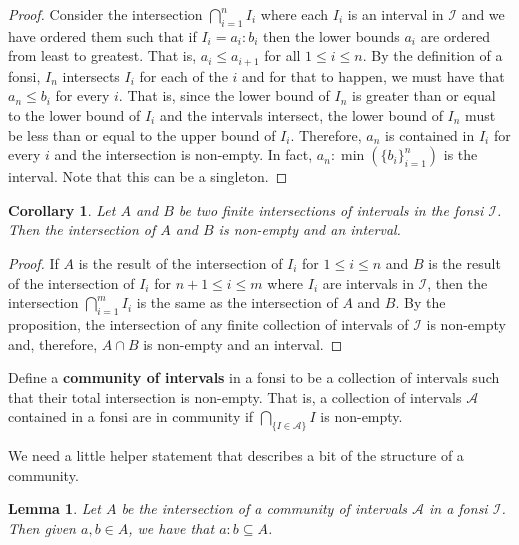 \documentclass[12pt]{article}
\newtheorem{lemma}{Lemma}[subsection]
\newtheorem{corollary}{Corollary}[subsection]
\begin{document}
\begin{proof} 
    Consider the intersection $\bigcap_{i=1}^n I_i$ where each $I_i$ is an interval in $\mathcal{I}$ and we have ordered them such that if $I_i = a_i : b_i$ then the lower bounds $a_i$ are ordered from least to greatest. That is,  $a_i \leq a_{i+1}$ for all $1 \leq i \leq n$. By the definition of a fonsi, $I_n$ intersects $I_i$ for each of the $i$ and for that to happen, we must have that $a_n \leq b_i$ for every $i$. That is, since the lower bound of $I_n$ is greater than or equal to the lower bound of $I_i$ and the intervals intersect, the lower bound of $I_n$ must be less than or equal to the upper bound of $I_i$. Therefore, $a_n$ is contained in $I_i$ for every $i$ and the intersection is non-empty. In fact, $a_n : \min(\{b_i\}_{i=1}^n)$ is the interval. Note that this can be a singleton. 
\end{proof}


\begin{corollary}
Let $A$ and $B$ be two finite intersections of intervals in the fonsi $\mathcal{I}$. Then the intersection of $A$ and $B$ is non-empty and an interval. 
\end{corollary}

\begin{proof}
    If $A$ is the result of the intersection of $I_i$ for $1 \leq i \leq n$ and $B$ is the result of the intersection of $I_i$ for $n+1 \leq i \leq m$ where $I_i$ are intervals in $\mathcal{I}$, then the intersection $\bigcap_{i=1}^m I_i$ is the same as the intersection of $A$ and $B$. By the proposition, the intersection of any finite collection of intervals of $\mathcal{I}$ is non-empty and, therefore, $A \cap B$ is non-empty and an interval. 
\end{proof}

Define a \textbf{community of intervals} in a fonsi to be  a collection of intervals such that their total intersection is non-empty. That is, a collection of intervals $\mathcal{A}$ contained in a fonsi are in community if $\bigcap_{\{I \in \mathcal{A}\}} I$ is non-empty. 

We need a little helper statement that describes a bit of the structure of a community.

\begin{lemma}
    Let $A$ be the intersection of a community of intervals $\mathcal{A}$ in a fonsi $\mathcal{I}$. Then given $a, b \in A$, we have that $a : b \subseteq A$.
\end{lemma}
\end{document}
